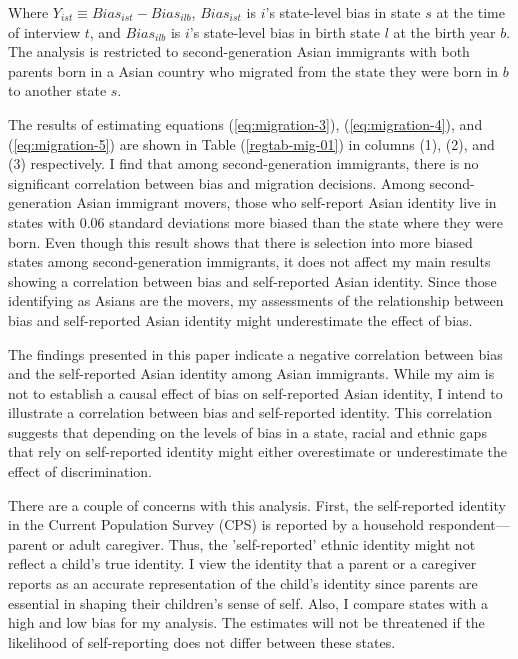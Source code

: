 Where $Y_{ist} \equiv Bias_{ist} -  Bias_{ilb}$, $Bias_{ist}$ is $i$'s state-level bias in state $s$ at the time of interview $t$, and  $Bias_{ilb}$ is $i$'s state-level bias in birth state $l$ at the birth year $b$. The analysis is restricted to second-generation Asian immigrants with both parents born in a Asian country who migrated from the state they were born in $b$ to another state $s$. 

The results of estimating equations (\ref{eq:migration-3}), (\ref{eq:migration-4}), and (\ref{eq:migration-5}) are shown in Table (\ref{regtab-mig-01}) in columns (1), (2), and (3) respectively. I find that among second-generation immigrants, there is no significant correlation between bias and migration decisions. Among second-generation Asian immigrant movers, those who self-report Asian identity live in states with 0.06 standard deviations more biased than the state where they were born. Even though this result shows that there is selection into more biased states among second-generation immigrants, it does not affect my main results showing a correlation between bias and self-reported Asian identity. Since those identifying as Asians are the movers, my assessments of the relationship between bias and self-reported Asian identity might underestimate the effect of bias.

The findings presented in this paper indicate a negative correlation between bias and the self-reported Asian identity among Asian immigrants. While my aim is not to establish a causal effect of bias on self-reported Asian identity, I intend to illustrate a correlation between bias and self-reported identity. This correlation suggests that depending on the levels of bias in a state, racial and ethnic gaps that rely on self-reported identity might either overestimate or underestimate the effect of discrimination.

There are a couple of concerns with this analysis. First, the self-reported identity in the Current Population Survey (CPS) is reported by a household respondent—parent or adult caregiver. Thus, the 'self-reported' ethnic identity might not reflect a child's true identity. I view the identity that a parent or a caregiver reports as an accurate representation of the child's identity since parents are essential in shaping their children's sense of self. Also, I compare states with a high and low bias for my analysis. The estimates will not be threatened if the likelihood of self-reporting does not differ between these states.

